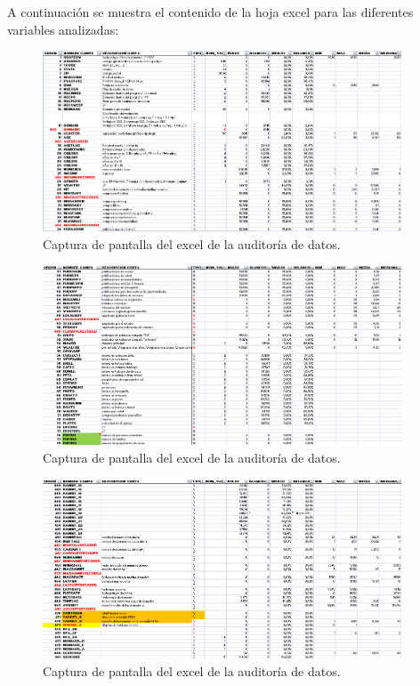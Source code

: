A continuación se muestra el contenido de la hoja excel para las diferentes variables analizadas:

\begin{figure}[H]
\begin{center}
\includegraphics[width=0.95\textwidth]{img/audit1}
\caption{Captura de pantalla del excel de la auditoría de datos.}
\end{center}
\end{figure}

\begin{figure}[H]
\begin{center}
\includegraphics[width=0.95\textwidth]{img/audit2}
\caption{Captura de pantalla del excel de la auditoría de datos.}
\end{center}
\end{figure}

\begin{figure}[H]
\begin{center}
\includegraphics[width=0.95\textwidth]{img/audit3}
\caption{Captura de pantalla del excel de la auditoría de datos.}
\end{center}
\end{figure}

